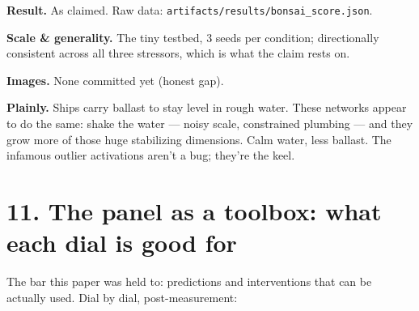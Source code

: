 \documentclass[10pt]{article}
\begin{document}
\textbf{Result.} As claimed. Raw data: \texttt{artifacts/results/bonsai\_score.json}.

\textbf{Scale \& generality.} The tiny testbed, 3 seeds per condition; directionally consistent across
all three stressors, which is what the claim rests on.

\textbf{Images.} None committed yet (honest gap).

\textbf{Plainly.} Ships carry ballast to stay level in rough water. These networks appear to do the
same: shake the water --- noisy scale, constrained plumbing --- and they grow more of those huge
stabilizing dimensions. Calm water, less ballast. The infamous outlier activations aren't a bug;
they're the keel.

\section{11. The panel as a toolbox: what each dial is good for}

The bar this paper was held to: predictions and interventions that can be actually used. Dial by
dial, post-measurement:
\end{document}
